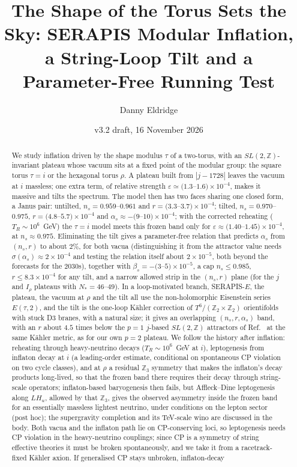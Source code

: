 \documentclass[aps,prd,twocolumn,superscriptaddress,nofootinbib,floatfix]{revtex4-2}
\begin{document}
\title{The Shape of the Torus Sets the Sky: SERAPIS Modular Inflation, a String-Loop Tilt and a Parameter-Free Running Test}
\author{Danny Eldridge}
\date{v3.2 draft, 16 November 2026}
\begin{abstract}
We study inflation driven by the shape modulus $\tau$ of a two-torus, with an $SL(2,\mathbb{Z})$-invariant plateau whose vacuum sits at a fixed point of the modular group: the square torus $\tau=i$ or the hexagonal torus $\rho$. A plateau built from $|j-1728|$ leaves the vacuum at $i$ massless; one extra term, of relative strength $\varepsilon\simeq(1.3$--$1.6)\times10^{-4}$, makes it massive and tilts the spectrum. The model then has two faces sharing one closed form, a Janus pair: untilted, $n_s=0.959$--$0.961$ and $r=(3.3$--$3.7)\times10^{-4}$; tilted, $n_s=0.970$--$0.975$, $r=(4.8$--$5.7)\times10^{-4}$ and $\alpha_s\approx-(9$--$10)\times10^{-4}$; with the corrected reheating ($T_R\sim10^6$~GeV) the $\tau=i$ model meets this frozen band only for $\varepsilon\approx(1.40$--$1.45)\times10^{-4}$, at $n_s\approx0.975$. Eliminating the tilt gives a parameter-free relation that predicts $\alpha_s$ from $(n_s,r)$ to about $2\%$, for both vacua (distinguishing it from the attractor value needs $\sigma(\alpha_s)\approx2\times10^{-4}$ and testing the relation itself about $2\times10^{-5}$, both beyond the forecasts for the 2030s), together with $\beta_s=-(3$--$5)\times10^{-5}$, a cap $n_s\le0.985$, $r\le8.3\times10^{-4}$ for any tilt, and a narrow allowed strip in the $(n_s,r)$ plane (for the $j$ and $I_\rho$ plateaus with $N_*=46$--$49$). In a loop-motivated branch, SERAPIS-$E$, the plateau, the vacuum at $\rho$ and the tilt all use the non-holomorphic Eisenstein series $E(\tau,2)$, and the tilt is the one-loop K\"ahler correction of $T^6/(\mathbb{Z}_2\times\mathbb{Z}_2)$ orientifolds with stuck D3 branes, with a natural size; it gives an overlapping $(n_s,r,\alpha_s)$ band, with an $r$ about $4.5$ times below the $p=1$ $j$-based $SL(2,\mathbb{Z})$ attractors of Ref.~\cite{arXiv_2408_05203} at the same K\"ahler metric, as for our own $p=2$ plateau. We follow the history after inflation: reheating through heavy-neutrino decays ($T_R\sim10^6$~GeV at $i$), leptogenesis from inflaton decay at $i$ (a leading-order estimate, conditional on spontaneous CP violation on two cycle classes), and at $\rho$ a residual $\mathbb{Z}_3$ symmetry that makes the inflaton's decay products long-lived, so that the frozen band there requires their decay through string-scale operators; inflaton-based baryogenesis then fails, but Affleck--Dine leptogenesis along $LH_u$, allowed by that $\mathbb{Z}_3$, gives the observed asymmetry inside the frozen band for an essentially massless lightest neutrino, under conditions on the lepton sector (post hoc); the supergravity completion and its TeV-scale wino are discussed in the body. Both vacua and the inflaton path lie on CP-conserving loci, so leptogenesis needs CP violation in the heavy-neutrino couplings; since CP is a symmetry of string effective theories it must be broken spontaneously, and we take it from a racetrack-fixed K\"ahler axion. If generalised CP stays unbroken, inflaton-decay 
\end{abstract}
\end{document}

